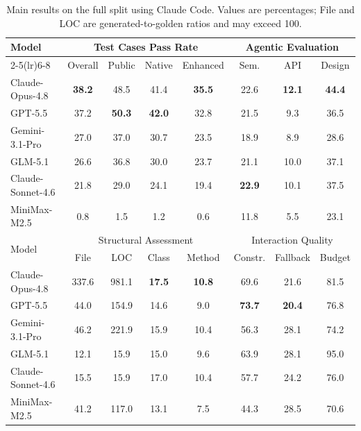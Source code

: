 \begin{table}[t]
\centering
\caption{Main results on the full \rcb{} split using Claude Code. Values are percentages; File and LOC are generated-to-golden ratios and may exceed 100.}
\label{tab:main-results-full}
\small
\begin{tabular}{lccccccc}
\toprule
\multirow{2}{*}{Model} & \multicolumn{4}{c}{Test Cases Pass Rate} & \multicolumn{3}{c}{Agentic Evaluation} \\
\cmidrule(lr){2-5}\cmidrule(lr){6-8}
 & Overall & Public & Native & Enhanced & Sem. & API & Design \\
\midrule
Claude-Opus-4.8 & \textbf{38.2} & 48.5 & 41.4 & \textbf{35.5} & 22.6 & \textbf{12.1} & \textbf{44.4} \\
GPT-5.5 & 37.2 & \textbf{50.3} & \textbf{42.0} & 32.8 & 21.5 & 9.3 & 36.5 \\
Gemini-3.1-Pro & 27.0 & 37.0 & 30.7 & 23.5 & 18.9 & 8.9 & 28.6 \\
GLM-5.1 & 26.6 & 36.8 & 30.0 & 23.7 & 21.1 & 10.0 & 37.1 \\
Claude-Sonnet-4.6 & 21.8 & 29.0 & 24.1 & 19.4 & \textbf{22.9} & 10.1 & 37.5 \\
MiniMax-M2.5 & 0.8 & 1.5 & 1.2 & 0.6 & 11.8 & 5.5 & 23.1 \\
\midrule
\multirow{2}{*}{Model} & \multicolumn{4}{c}{Structural Assessment} & \multicolumn{3}{c}{Interaction Quality} \\
\cmidrule(lr){2-5}\cmidrule(lr){6-8}
 & File & LOC & Class & Method & Constr. & Fallback & Budget \\
\midrule
Claude-Opus-4.8 & 337.6 & 981.1 & \textbf{17.5} & \textbf{10.8} & 69.6 & 21.6 & 81.5 \\
GPT-5.5 & 44.0 & 154.9 & 14.6 & 9.0 & \textbf{73.7} & \textbf{20.4} & 76.8 \\
Gemini-3.1-Pro & 46.2 & 221.9 & 15.9 & 10.4 & 56.3 & 28.1 & 74.2 \\
GLM-5.1 & 12.1 & 15.9 & 15.0 & 9.6 & 63.9 & 28.1 & 95.0 \\
Claude-Sonnet-4.6 & 15.5 & 15.9 & 17.0 & 10.4 & 57.7 & 24.2 & 76.0 \\
MiniMax-M2.5 & 41.2 & 117.0 & 13.1 & 7.5 & 44.3 & 28.5 & 70.6 \\
\bottomrule
\end{tabular}
\end{table}

